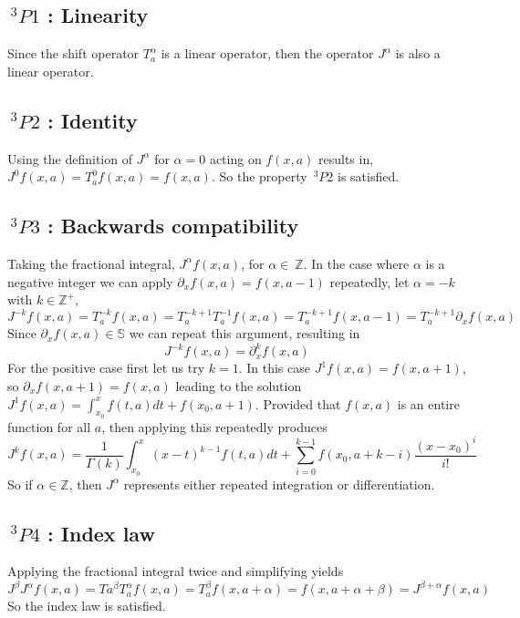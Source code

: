 \documentclass[%
 onecolumn,
 amsmath, amssymb, aps, pra, 10pt
]{revtex4-2}
\begin{document}
\subsection*{$\,^3P1$ : Linearity}
Since the shift operator $T_{a}^{\alpha}$ is a linear operator, then the operator $J^{\alpha}$ is also a linear operator.

\subsection*{$\,^3P2$ : Identity}
Using the definition of $J^{\alpha}$ for $\alpha=0$ acting on $f(x, a)$ results in, $J^{0}f(x, a) = T_{a}^{0}f(x, a) = f(x, a)$. So the property $\,^3P2$ is satisfied.

\subsection*{$\,^3P3$ : Backwards compatibility}
Taking the fractional integral, $J^{\alpha} f(x, a)$, for $\alpha \in\ \mathbb{Z}$. In the case where $\alpha$ is a negative integer we can apply $\partial_x f(x, a) = f(x, a - 1)$ repeatedly, let $\alpha = -k$ with $k \in \mathbb{Z}^+$,
$$J^{-k} f(x, a) = T_{a}^{-k} f(x, a)=T_{a}^{-k + 1}T_{a}^{-1} f(x, a) = T_{a}^{-k + 1}f(x, a - 1) = T_{a}^{-k + 1}\partial_x f(x, a)$$
Since $\partial_x f(x, a) \in \mathbb{S}$ we can repeat this argument, resulting in
$$J^{-k} f(x, a) = \partial_{x}^{k} f(x, a)$$
For the positive case first let us try $k=1$. In this case $J^{1} f(x, a) = f(x, a + 1)$, so $\partial_x f(x, a + 1) = f(x, a)$ leading to the solution $J^{1} f(x, a) = \int_{x_0}^{x} f(t, a)dt + f(x_0, a + 1)$. Provided that $f(x, a)$ is an entire function for all $a$, then applying this repeatedly produces
$$J^{k} f(x, a) = \frac{1}{\Gamma(k)}\int_{x_0}^{x} (x - t)^{k - 1}f(t, a)dt + \sum_{i = 0}^{k - 1}f(x_0, a + k - i)\frac{(x - x_0)^i}{i!}$$
So if $\alpha \in \mathbb{Z}$, then $J^{\alpha}$ represents either repeated integration or differentiation.

\subsection*{$\,^3P4$ : Index law}
Applying the fractional integral twice and simplifying yields
$$J^{\beta}J^{\alpha} f(x, a) = T{a}^{\beta}T_{a}^{\alpha} f(x, a) = T_{a}^{\beta} f(x, a + \alpha) = f(x, a + \alpha + \beta) = J^{\beta + \alpha} f(x, a)$$
So the index law is satisfied.
\end{document}
